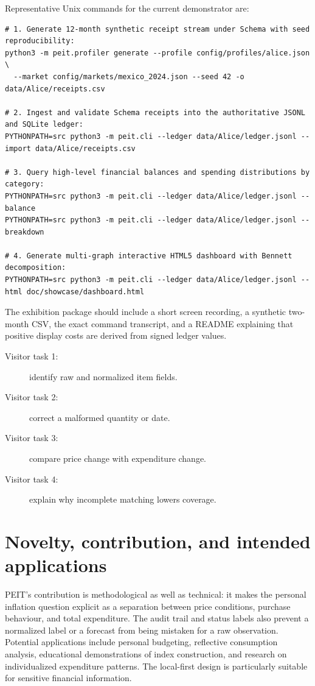 \documentclass[10pt,a4paper]{article}
\newcommand{\chapter}[1]{
  \section{#1}
}
\begin{document}
Representative Unix commands for the current demonstrator are:

\begin{verbatim}
# 1. Generate 12-month synthetic receipt stream under Schema with seed reproducibility:
python3 -m peit.profiler generate --profile config/profiles/alice.json \
  --market config/markets/mexico_2024.json --seed 42 -o data/Alice/receipts.csv

# 2. Ingest and validate Schema receipts into the authoritative JSONL and SQLite ledger:
PYTHONPATH=src python3 -m peit.cli --ledger data/Alice/ledger.jsonl --import data/Alice/receipts.csv

# 3. Query high-level financial balances and spending distributions by category:
PYTHONPATH=src python3 -m peit.cli --ledger data/Alice/ledger.jsonl --balance
PYTHONPATH=src python3 -m peit.cli --ledger data/Alice/ledger.jsonl --breakdown

# 4. Generate multi-graph interactive HTML5 dashboard with Bennett decomposition:
PYTHONPATH=src python3 -m peit.cli --ledger data/Alice/ledger.jsonl --html doc/showcase/dashboard.html
\end{verbatim}

The exhibition package should include a short screen recording, a synthetic
two-month CSV, the exact command transcript, and a README explaining that
positive display costs are derived from signed ledger values.

\begin{description}
  \item[Visitor task 1:] identify raw and normalized item fields.
  \item[Visitor task 2:] correct a malformed quantity or date.
  \item[Visitor task 3:] compare price change with expenditure change.
  \item[Visitor task 4:] explain why incomplete matching lowers coverage.
\end{description}

\chapter{Novelty, contribution, and intended applications}
PEIT's contribution is methodological as well as technical: it makes the
personal inflation question explicit as a separation between price conditions,
purchase behaviour, and total expenditure. The audit trail and status labels
also prevent a normalized label or a forecast from being mistaken for a raw
observation. Potential applications include personal budgeting, reflective
consumption analysis, educational demonstrations of index construction, and
research on individualized expenditure patterns. The local-first design is
particularly suitable for sensitive financial information.
\end{document}
